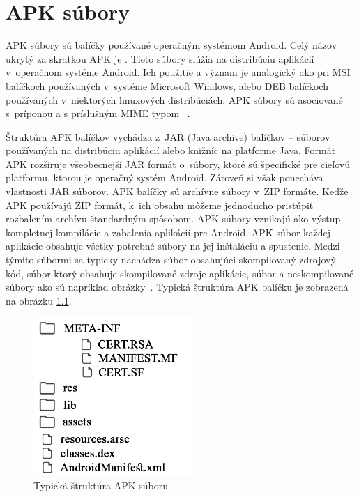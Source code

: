 \chapter{APK súbory}
\label{APKsubory}
APK súbory sú balíčky používané operačným systémom Android. Celý názov ukrytý za skratkou APK je . Tieto súbory slúžia na distribúciu aplikácií v~operačnom systéme Android. Ich použitie a význam je analogický ako pri MSI balíčkoch používaných v~systéme Microsoft Windows, alebo DEB balíčkoch používaných v~niektorých linuxových distribúciách. APK súbory sú asociované s~príponou  a s príslušným MIME typom ~\cite{Freed2016}.

Štruktúra APK balíčkov vychádza z~JAR (Java archive) balíčkov -- súborov používaných na distribúciu aplikácií alebo knižníc na platforme Java. Formát APK rozširuje všeobecnejší JAR formát o~súbory, ktoré sú špecifické pre cieľovú platformu, ktorou je operačný systém Android. Zároveň si však ponecháva vlastnosti JAR súborov. APK balíčky sú archívne súbory v~ZIP formáte. Keďže APK používajú ZIP formát, k~ich obsahu môžeme jednoducho pristúpiť rozbalením archívu štandardným spôsobom.  APK súbory vznikajú ako výstup kompletnej kompilácie a zabalenia aplikácií pre Android. APK súbor každej aplikácie obsahuje všetky potrebné súbory na jej inštaláciu a spustenie. Medzi týmito súbormi sa typicky nachádza súbor  obsahujúci skompilovaný zdrojový kód, súbor  ktorý obsahuje skompilované zdroje aplikácie, súbor  a neskompilované súbory ako sú napríklad obrázky~\cite{buildingAndRunning}. Typická štruktúra APK balíčku je zobrazená na obrázku \ref{fig:strukturaApk}.
\begin{figure}[htb]
  \begin{center}
    \includegraphics[width=60mm]{images/apkStructure.pdf}
  \end{center}
  \caption{Typická štruktúra APK súboru}
  \label{fig:strukturaApk}
\end{figure}
